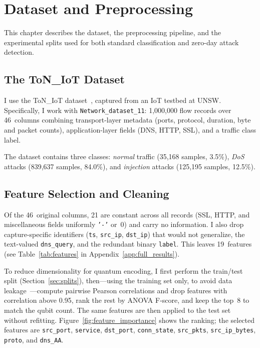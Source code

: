 \chapter{Dataset and Preprocessing}
\label{chap:dataset}

This chapter describes the dataset, the preprocessing pipeline, and the experimental splits used for both standard classification and zero-day attack detection.

\section{The ToN\_IoT Dataset}
\label{sec:toniot}

I use the ToN\_IoT dataset~\cite{toniot2020dataset}, captured from an IoT testbed at UNSW. Specifically, I work with \texttt{Network\_dataset\_11}: 1,000,000 flow records over 46~columns combining transport-layer metadata (ports, protocol, duration, byte and packet counts), application-layer fields (DNS, HTTP, SSL), and a traffic class label.

The dataset contains three classes: \emph{normal} traffic (35,168 samples, 3.5\%), \emph{DoS} attacks (839,637 samples, 84.0\%), and \emph{injection} attacks (125,195 samples, 12.5\%).

\section{Feature Selection and Cleaning}
\label{sec:cleaning}

Of the 46~original columns, 21 are constant across all records (SSL, HTTP, and miscellaneous fields uniformly \texttt{'-'} or~0) and carry no information. I also drop capture-specific identifiers (\texttt{ts}, \texttt{src\_ip}, \texttt{dst\_ip}) that would not generalize, the text-valued \texttt{dns\_query}, and the redundant binary \texttt{label}. This leaves 19~features (see Table~\ref{tab:features} in Appendix~\ref{app:full_results}).

To reduce dimensionality for quantum encoding, I first perform the train/test split (Section~\ref{sec:splits}), then---using the training set only, to avoid data leakage~\cite{kapoor2023leakage}---compute pairwise Pearson correlations and drop features with correlation above 0.95, rank the rest by ANOVA F-score, and keep the top~8 to match the qubit count. The same features are then applied to the test set without refitting. Figure~\ref{fig:feature_importance} shows the ranking; the selected features are \texttt{src\_port}, \texttt{service}, \texttt{dst\_port}, \texttt{conn\_state}, \texttt{src\_pkts}, \texttt{src\_ip\_bytes}, \texttt{proto}, and \texttt{dns\_AA}.

